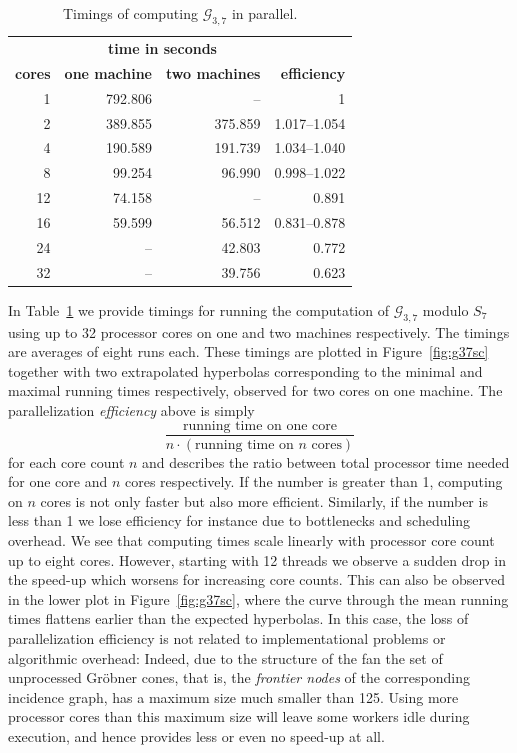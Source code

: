 \documentclass[
  paper=a4,
  titlepage,
  bibliography=totoc,
  pagesize=pdftex
]{scrartcl}
\numberwithin{figure}{section}
\numberwithin{equation}{section}
\numberwithin{table}{section}
\theoremstyle{definition}
\numberwithin{definition}{section}
\begin{document}
\begin{table}[tbh]
  \centering
  \begin{tabular}{r||r|r||r}
                   & \multicolumn{2}{c||}{\textbf{time in seconds}} &\\
    \textbf{cores} & \textbf{one machine} & \textbf{two machines} &
    \textbf{efficiency} \\ \hline
    1   & 792.806 &      -- & 1 \\
    2   & 389.855 & 375.859 & 1.017--1.054 \\
    4   & 190.589 & 191.739 & 1.034--1.040 \\
    8   &  99.254 &  96.990 & 0.998--1.022 \\
    12  &  74.158 &      -- & 0.891 \\
    16  &  59.599 &  56.512 & 0.831--0.878 \\
    24  &      -- &  42.803 & 0.772 \\
    32  &      -- &  39.756 & 0.623
  \end{tabular}
  \caption{Timings of computing $\mathcal G_{3,7}$ in parallel.}
  \label{tab:g37}
\end{table}

In Table~\ref{tab:g37} we provide timings for running the computation of $\mathcal
G_{3,7}$ modulo $S_7$ using up to 32 processor cores on one and two machines respectively.
The timings are averages of eight runs each. These timings are plotted in
Figure~\ref{fig:g37sc} together with two extrapolated hyperbolas corresponding to the
minimal and maximal running times respectively, observed for two cores on one machine. The
parallelization \emph{efficiency} above is simply
\[
  \frac{ \text{running time on one core} }{ n \cdot (\text{running time on $n$ cores})}
\]
for each core count $n$ and describes the ratio between total processor time needed for
one core and $n$ cores respectively. If the number is greater than 1, computing on $n$
cores is not only faster but also more efficient. Similarly, if the number is less than 1
we lose efficiency for instance due to bottlenecks and scheduling overhead. We see that
computing times scale linearly with processor core count up to eight cores. However,
starting with 12 threads we observe a sudden drop in the speed-up which worsens for
increasing core counts. This can also be observed in the lower plot in
Figure~\ref{fig:g37sc}, where the curve through the mean running times flattens earlier
than the expected hyperbolas. In this case, the loss of parallelization efficiency is not
related to implementational problems or algorithmic overhead: Indeed, due to the structure
of the fan the set of unprocessed Gröbner cones, that is, the \emph{frontier nodes} of the
corresponding incidence graph, has a maximum size much smaller than 125. Using more
processor cores than this maximum size will leave some workers idle during execution,
and hence provides less or even no speed-up at all.
\end{document}
